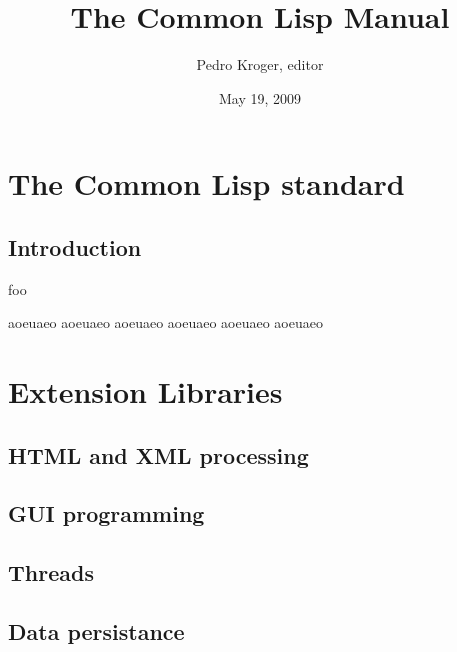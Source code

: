 \documentclass[10pt,english]{book}
\title{The Common Lisp Manual}
\author{Pedro Kroger, editor}
\date{May 19, 2009}
\begin{document}
\frontmatter

\maketitle
\tableofcontents

\mainmatter

\part{The Common Lisp standard}
\label{part:common-lisp-standard}

\chapter{Introduction}

\begin{note}
  foo
\end{note}

\begin{devnote}
  aoeuaeo
  aoeuaeo
  aoeuaeo
  aoeuaeo
  aoeuaeo
  aoeuaeo
\end{devnote}























\part{Extension Libraries}
\label{part:libraries}

\chapter{HTML and XML processing}

\chapter{GUI programming}

\chapter{Threads}

\chapter{Data persistance}
\end{document}

